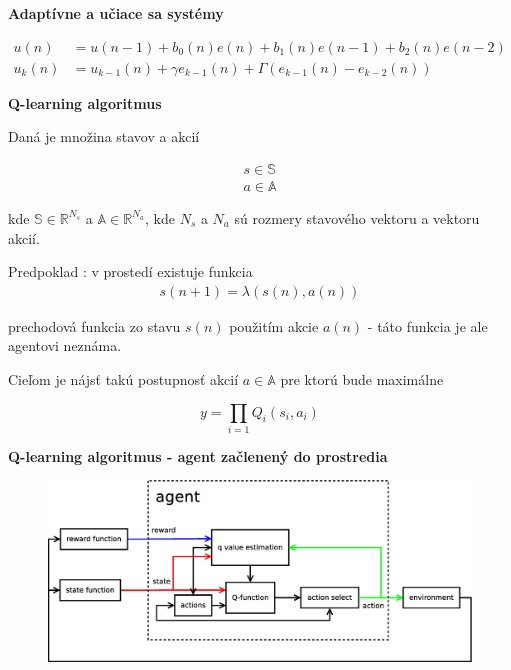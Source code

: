 \documentclass[xcolor=dvipsnames]{beamer}
\begin{document}
\begin{frame}{\bf Adaptívne a učiace sa systémy}
\begin{minipage}{.5\textwidth}
\end{minipage}

\begin{align} \label{eu_eqn}
  u(n) &= u(n-1) + b_0(n)e(n) + b_1(n)e(n-1) + b_2(n)e(n-2) \nonumber \\
  u_{k}(n) &= u_{k-1}(n) + \gamma e_{k-1}(n) + \Gamma (e_{k-1}(n) - e_{k-2}(n)) \nonumber
\end{align}

\end{frame}


\begin{frame}{\bf Q-learning algoritmus}

Daná je množina stavov a akcií

\begin{align}
        s \in \mathbb{S} \nonumber\\
        a \in \mathbb{A} \nonumber
\end{align}

kde $\mathbb{S} \in \mathbb{R}^{N_s}$ a $\mathbb{A} \in \mathbb{R}^{N_a}$, kde
$N_s$ a  $N_a$ sú rozmery stavového vektoru a vektoru akcií.

Predpoklad : v prostedí existuje funkcia
\begin{align}
        s(n+1) = \lambda(s(n), a(n))
\end{align}

prechodová funkcia zo stavu $s(n)$ použitím akcie $a(n)$ - táto funkcia je ale agentovi neznáma.

Cieľom je nájsť takú postupnosť akcií $a \in \mathbb{A}$ pre ktorú bude maximálne

\begin{equation} \label{eu_eqn}
y = \prod_{i=1}Q_i(s_i, a_i)
\end{equation}



\end{frame}




\begin{frame}{\bf Q-learning algoritmus - agent začlenený do prostredia}

\begin{figure}[!htb]
\includegraphics[scale=.3]{../diagrams/q_learning_agent.eps}
\end{figure}

\end{frame}
\end{document}
